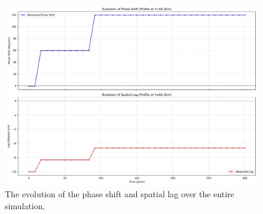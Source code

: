 \begin{figure}[H]
    \includegraphics[scale=0.30]{figures/S1_F_phase_evolution_summary.png}
    \caption{The evolution of the phase shift and spatial lag over the entire simulation.}
    \label{fig:phase_analysis_Evolution_Plots}
\end{figure}
